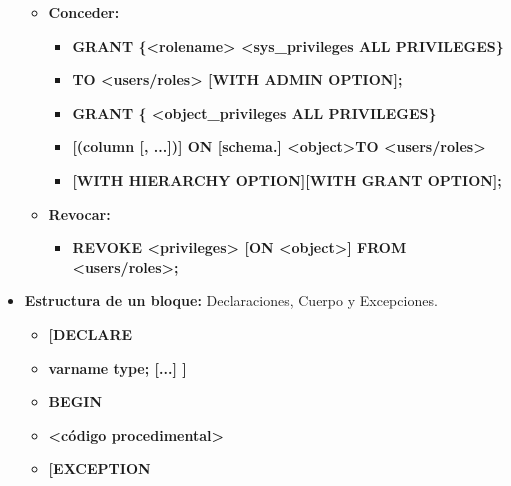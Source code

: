 \documentclass[12pt, twoside, openright]{report} %
\begin{document}
\begin{itemize}
    \begin{itemize}
    \item \textbf{Conceder:}
      

      \begin{itemize}
      \item \textbf{GRANT \{\textless rolename\textgreater{} \textbar{}
        \textless sys\_privileges \textbar{} ALL PRIVILEGES\}}
        
      \item \textbf{TO \textless users/roles\textgreater{} {[}WITH ADMIN
        OPTION{]};}
        
      \item \textbf{GRANT \{ \textless object\_privileges \textbar{} ALL
        PRIVILEGES\}}
        
      \item \textbf{{[}(column {[}, ...{]}){]} ON {[}schema.{]}
        \textless object\textgreater TO
        \textless users/roles\textgreater{}}
        
      \item \textbf{{[}WITH HIERARCHY OPTION{]}{[}WITH GRANT OPTION{]};}
        
      \end{itemize}
    \item \textbf{Revocar:}
      

      \begin{itemize}
      \item \textbf{REVOKE \textless privileges\textgreater{} {[}ON
        \textless object\textgreater{]} FROM
        \textless users/roles\textgreater;}
        
      \end{itemize}
    \end{itemize}
  \item \textbf{Estructura de un bloque:} Declaraciones, Cuerpo y
    Excepciones.
    

    \begin{itemize}
    \item \textbf{{[}DECLARE}
      
    \item \textbf{varname type; {[}...{]} {]}}
      
    \item \textbf{BEGIN}
      
    \item \textbf{\textless código procedimental\textgreater{}}
      
    \item \textbf{{[}EXCEPTION}
      

\end{itemize}
\end{itemize}
\end{document}
